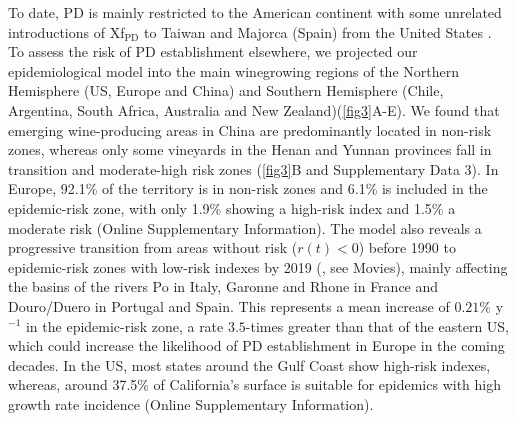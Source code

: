     To date, PD is mainly restricted to the American continent with some
    unrelated
    introductions of Xf$_{\textrm{PD}}$ to Taiwan and Majorca (Spain) from the
    United States \cite{Moralejo2019,Su2013}. To assess the risk of PD
    establishment elsewhere, we projected our epidemiological model into the
    main
    winegrowing regions of the Northern Hemisphere (US, Europe and China) and
    Southern Hemisphere (Chile, Argentina, South Africa, Australia and New
    Zealand)(\cref{fig3}A-E). We found that emerging wine-producing areas in
    China
    are predominantly located in non-risk zones, whereas only some vineyards in
    the
    Henan and Yunnan provinces fall in transition and moderate-high risk zones
    (\cref{fig3}B and Supplementary Data 3). In Europe, 92.1\% of the territory
    is
    in non-risk zones and 6.1\% is included in the epidemic-risk zone, with
    only
    1.9\% showing a high-risk index and 1.5\% a moderate risk
    (Online Supplementary Information).
    The model also reveals a progressive transition from areas without risk
    ($r(t)
< 0$) before 1990 to epidemic-risk zones with low-risk indexes by 2019
    (\cite{Webpage}, see Movies), mainly affecting the basins of the rivers Po
    in
    Italy, Garonne and Rhone in France and Douro/Duero in Portugal and Spain.
    This
    represents a mean increase of $0.21\%$ y$^{-1}$ in the epidemic-risk zone,
    a
    rate $3.5$-times greater than that of the eastern US, which could increase
    the
    likelihood of PD establishment in Europe in the coming decades. In the US,
    most
    states around the Gulf Coast show high-risk indexes, whereas, around 37.5\%
    of
    California's surface is suitable for epidemics with high growth rate
    incidence
    (Online Supplementary Information).

